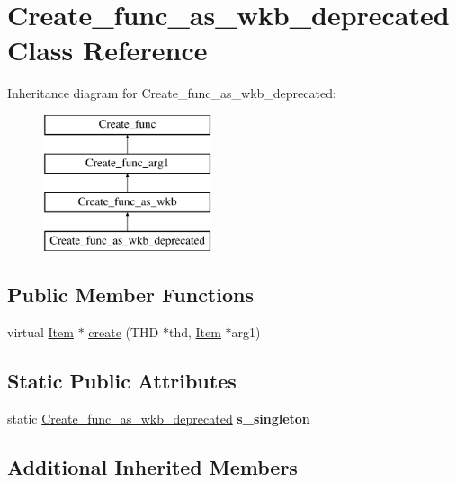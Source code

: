\hypertarget{classCreate__func__as__wkb__deprecated}{}\section{Create\+\_\+func\+\_\+as\+\_\+wkb\+\_\+deprecated Class Reference}
\label{classCreate__func__as__wkb__deprecated}
Inheritance diagram for Create\+\_\+func\+\_\+as\+\_\+wkb\+\_\+deprecated\+:\begin{figure}[H]
\begin{center}
\leavevmode
\includegraphics[height=4.000000cm]{classCreate__func__as__wkb__deprecated}
\end{center}
\end{figure}
\subsection*{Public Member Functions}
\begin{DoxyCompactItemize}
\item 
virtual \mbox{\hyperlink{classItem}{Item}} $\ast$ \mbox{\hyperlink{classCreate__func__as__wkb__deprecated_ae98811a32d56c5283066bf6ecd63f0e1}{create}} (T\+HD $\ast$thd, \mbox{\hyperlink{classItem}{Item}} $\ast$arg1)
\end{DoxyCompactItemize}
\subsection*{Static Public Attributes}
\begin{DoxyCompactItemize}
\item 
\mbox{\label{classCreate__func__as__wkb__deprecated_a6f99713d02b2358b73aabbe684a604a6}} 
static \mbox{\hyperlink{classCreate__func__as__wkb__deprecated}{Create\+\_\+func\+\_\+as\+\_\+wkb\+\_\+deprecated}} {\bfseries s\+\_\+singleton}
\end{DoxyCompactItemize}
\subsection*{Additional Inherited Members}


